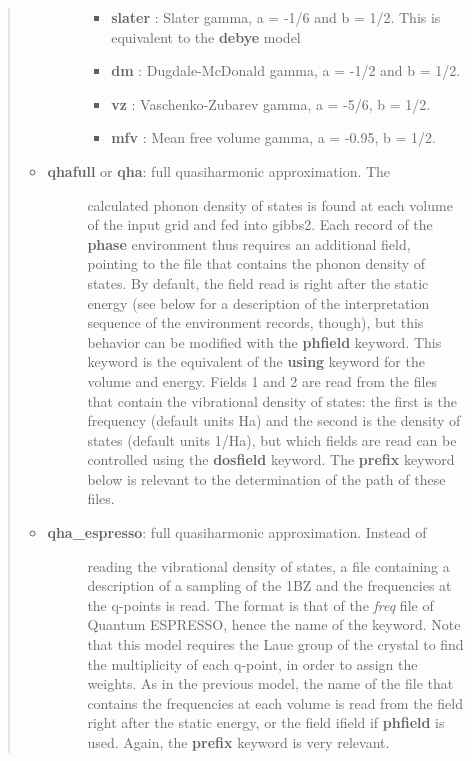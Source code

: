 \documentclass[a4paper]{article}
\begin{document}
\begin{itemize}
\begin{quote}
\begin{itemize}
\begin{description}
\begin{itemize}
\item \textbf{slater} : Slater gamma, a = -1/6 and b = 1/2. This is
equivalent to the \textbf{debye} model

\item \textbf{dm} : Dugdale-McDonald gamma, a = -1/2 and b = 1/2.

\item \textbf{vz} : Vaschenko-Zubarev gamma, a = -5/6, b = 1/2.

\item \textbf{mfv} : Mean free volume gamma, a = -0.95, b = 1/2.

\end{itemize}

\end{description}

\item %
\begin{description}
\item[{\textbf{qhafull} or \textbf{qha}: full quasiharmonic approximation. The}] \leavevmode 
calculated phonon density of states is found at each volume of
the input grid and fed into gibbs2. Each record of the
\textbf{phase} environment thus requires an additional field,
pointing to the file that contains the phonon density of
states. By default, the field read is right after the static
energy (see below for a description of the interpretation
sequence of the environment records, though), but this
behavior can be modified with the \textbf{phfield} keyword. This
keyword is the equivalent of the \textbf{using} keyword for the
volume and energy. Fields 1 and 2 are read from the files that
contain the vibrational density of states: the first is the
frequency (default units Ha) and the second is the density of
states (default units 1/Ha), but which fields are read can be
controlled using the \textbf{dosfield} keyword. The \textbf{prefix}
keyword below is relevant to the determination of the path of
these files.

\end{description}

\item %
\begin{description}
\item[{\textbf{qha\_espresso}: full quasiharmonic approximation. Instead of}] \leavevmode 
reading the vibrational density of states, a file containing a
description of a sampling of the 1BZ and the frequencies at the
q-points is read. The format is that of the \emph{freq} file of
Quantum ESPRESSO, hence the name of the keyword. Note that this
model requires the Laue group of the crystal to find the
multiplicity of each q-point, in order to assign the
weights. As in the previous model, the name of the file that
contains the frequencies at each volume is read from the field
right after the static energy, or the field ifield if
\textbf{phfield} is used. Again, the \textbf{prefix} keyword is very
relevant.


\end{description}
\end{itemize}
\end{quote}
\end{itemize}
\end{document}
